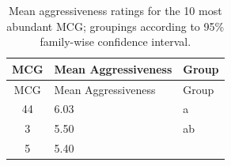 \begin{longtable}[]{@{}cll@{}}
\caption{\label{tab:MCG-aggressiveness} Mean aggressiveness ratings for the
10 most abundant MCG; groupings according to 95\% family-wise confidence
interval.}\tabularnewline
\toprule
\begin{minipage}[b]{0.10\columnwidth}\centering\strut
MCG\strut
\end{minipage} & \begin{minipage}[b]{0.25\columnwidth}\raggedright\strut
Mean Aggressiveness\strut
\end{minipage} & \begin{minipage}[b]{0.08\columnwidth}\raggedright\strut
Group\strut
\end{minipage}\tabularnewline
\midrule
\endfirsthead
\toprule
\begin{minipage}[b]{0.10\columnwidth}\centering\strut
MCG\strut
\end{minipage} & \begin{minipage}[b]{0.25\columnwidth}\raggedright\strut
Mean Aggressiveness\strut
\end{minipage} & \begin{minipage}[b]{0.08\columnwidth}\raggedright\strut
Group\strut
\end{minipage}\tabularnewline
\midrule
\endhead
\begin{minipage}[t]{0.10\columnwidth}\centering\strut
44\strut
\end{minipage} & \begin{minipage}[t]{0.25\columnwidth}\raggedright\strut
6.03\strut
\end{minipage} & \begin{minipage}[t]{0.08\columnwidth}\raggedright\strut
a\strut
\end{minipage}\tabularnewline
\begin{minipage}[t]{0.10\columnwidth}\centering\strut
3\strut
\end{minipage} & \begin{minipage}[t]{0.25\columnwidth}\raggedright\strut
5.50\strut
\end{minipage} & \begin{minipage}[t]{0.08\columnwidth}\raggedright\strut
ab\strut
\end{minipage}\tabularnewline
\begin{minipage}[t]{0.10\columnwidth}\centering\strut
5\strut
\end{minipage} & \begin{minipage}[t]{0.25\columnwidth}\raggedright\strut
5.40\strut

\end{minipage}
\end{longtable}
